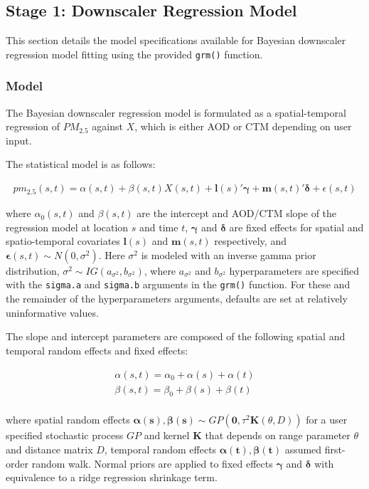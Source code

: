 \documentclass[12pt]{article}
\newcommand{\bs}{\boldsymbol}
\newcommand{\bl}{\mathbf}
\begin{document}
\subsection*{Stage 1: Downscaler Regression Model}

This section details the model specifications available for Bayesian downscaler regression model fitting using the provided \texttt{grm()} function. 

\subsubsection*{Model}

The Bayesian downscaler regression model is formulated as a spatial-temporal regression of $PM_{2.5}$ against $X$, which is either AOD or CTM depending on user input. 

The statistical model is as follows:

\begin{align*} 
    pm_{2.5}(s,t) = \alpha(s, t) + \beta(s, t) X(s, t) + \mathbf{l}(s)' \bs{\gamma} +  \mathbf{m}(s, t)' \boldsymbol{\delta} + \epsilon(s, t)
\end{align*}
         
where $\alpha_0(s, t)$ and $\beta(s, t)$ are the intercept and AOD/CTM slope of the regression model at location $s$ and time $t$, $\bs{\gamma}$ and $\bs{\delta}$ are fixed effects for spatial and spatio-temporal covariates $\mathbf{l}(s)$ and $\mathbf{m}(s, t)$ respectively, and $\bs{\epsilon}(s, t) \sim N(0, \sigma^2)$. Here $\sigma^2$ is modeled with an inverse gamma prior distribution, $\sigma^2 \sim IG(a_{\sigma^2}, b_{\sigma^2})$, where $a_{\sigma^2}$ and $b_{\sigma^2}$ hyperparameters are specified with the \texttt{sigma.a} and \texttt{sigma.b} arguments in the \texttt{grm()} function.
For these and the remainder of the hyperparameters arguments, defaults are set at relatively uninformative values.

The slope and intercept parameters are composed of the following spatial and temporal random effects and fixed effects:

\begin{align*}
    \alpha(s, t) = \alpha_0 + \alpha(s) + \alpha(t) \\
    \beta(s, t) = \beta_0 + \beta(s) + \beta(t) \\
\end{align*} 

where spatial random effects $\bs{\alpha}(\bl{s}), \bs{\beta}(\bl{s}) \sim GP(\bl{0}, \tau^2 \bl{K}(\theta, D))$ for a user specified stochastic process $GP$ and kernel $\bl{K}$ that depends on range parameter $\theta$ and distance matrix $D$, temporal random effects $\bs{\alpha}(\bl{t}), \bs{\beta}(\bl{t})$ assumed first-order random walk.
 Normal priors are applied to fixed effects $\bs{\gamma}$ and $\bs{\delta}$ with equivalence to a ridge regression shrinkage term. 
\end{document}

